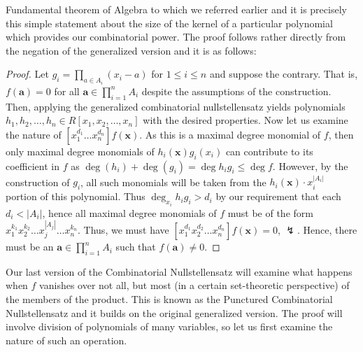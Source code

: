 	Fundamental theorem of Algebra to which we referred earlier and it is
	precisely this simple statement about the size of the kernel of a
	particular polynomial which provides our combinatorial power. The proof
	follows rather directly from the negation of the generalized version and it is
	as follows: \begin{proof}[Proof] Let $g_i = \prod_{a \in A_i}^{} \left(
		x_{i} - a \right) $ for $1 \le i \le n$ and suppose the
		contrary. That is, $f\left( \textbf{a} \right) = 0$ for all $
		\textbf{a} \in \prod_{i= 1}^{n} A_i $ despite the assumptions of the construction. Then, applying the
		generalized combinatorial nullstellensatz yields polynomials
		$h_1, h_2, \ldots, h_n \in R[x_1, x_2, \ldots, x_{n}]$ with the
		desired properties. Now let us examine the nature of
		$[x_1^{d_1}\ldots x_{n}^{ d_n}] f\left( \textbf{x} \right) $.
		As this is a maximal degree monomial of $f$, then only maximal
		degree monomials of $h_i \left( \textbf{x} \right)  g_i \left(
		x_i \right) $ can contribute to its coefficient in $f$ as $\deg \left( h_{i} \right) + \deg \left( g_{i} \right) = \deg
		h_i g_i \le \deg f$. However, by the construction of $g_i$, all
		such monomials will be taken from the $h_i \left( \textbf{x}
		\right) \cdot x_i ^{ \left| A_i \right| } $ portion of this
		polynomial. Thus $\deg _{x_{i}} h_i g_i> d_i$ by our
		requirement that each  $d_i < \left| A_i \right| $, hence all
	maximal degree monomials of $f$ must be of the form
$x_1^{k_1}x_2^{k_2}\ldots x_{j}^{\left| A_j \right|} \ldots x_{n}^{ k_n}$.
Thus, we must have $[x_1^{d_1}x_2^{d_2}\ldots x_{n}^{d_n}] f\left( \textbf{x}
\right) = 0$, $\lightning$. Hence, there must be an $ \textbf{a} \in \prod_{i=
1}^{n} A_i $ such that $f\left( \textbf{a} \right) \neq 0$.  \end{proof} Our
last version of the Combinatorial Nullstellensatz will examine what happens
when $f$ vanishes over not all, but most (in a certain set-theoretic
perspective) of the members of the product. This is known as the Punctured
Combinatorial Nullstellensatz and it builds on the original generalized
version. The proof will involve division of polynomials of many variables, so
let us first examine the nature of such an operation.
